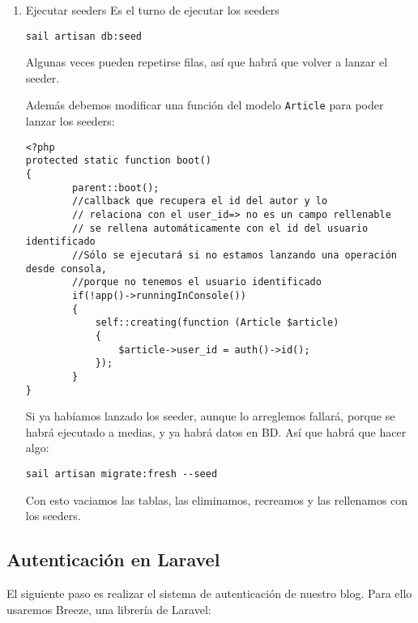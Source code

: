 \documentclass[11pt]{article}
\begin{document}
\begin{enumerate}
\item Ejecutar seeders
\label{sec:orgbd968f0}
Es el turno de ejecutar los seeders
\begin{verbatim}
sail artisan db:seed
\end{verbatim}

Algunas veces pueden repetirse filas, así que habrá que volver a
lanzar el seeder.

Además debemos modificar una función del modelo \texttt{Article} para poder
lanzar los seeders:
\begin{verbatim}
<?php
protected static function boot()
{
        parent::boot();
        //callback que recupera el id del autor y lo
        // relaciona con el user_id=> no es un campo rellenable
        // se rellena automáticamente con el id del usuario identificado
        //Sólo se ejecutará si no estamos lanzando una operación desde consola,
        //porque no tenemos el usuario identificado
        if(!app()->runningInConsole())
        {
            self::creating(function (Article $article)
            {
                $article->user_id = auth()->id();
            });
        }
}
\end{verbatim}

Si ya habíamos lanzado los seeder, aunque lo arreglemos fallará,
porque se habrá ejecutado a medias, y ya habrá datos en BD. Así que
habrá que hacer algo:
\begin{verbatim}
sail artisan migrate:fresh --seed
\end{verbatim}

Con esto vaciamos las tablas, las eliminamos, recreamos y las
rellenamos con los seeders.
\end{enumerate}



\subsection{Autenticación en Laravel}
\label{sec:orgb82b922}
El siguiente paso es realizar el sistema de autenticación de nuestro
blog. Para ello usaremos Breeze, una librería de Laravel:
\end{document}
